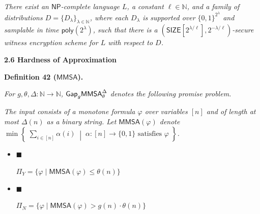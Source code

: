 \emph{There exist an ${\mathsf{NP}}$-complete language $L$, a constant $\ell\in\mathbb{N}$, and a family of distributions $D=\{D_{\lambda}\}_{\lambda\in\mathbb{N}}$, where each $D_{\lambda}$ is supported over $\{0,1\}^{2^{\lambda}}$ and samplable in time ${\mathsf{poly}}(2^{\lambda})$, such that there is a $({\mathsf{SIZE}}[2^{\lambda/\ell}],2^{-\lambda/\ell})$-secure witness encryption scheme for $L$ with respect to $D$.}\par







\par\medskip\noindent\textbf{
2.6 Hardness of Approximation}\par





\par\medskip\noindent\textbf{
\textbf{Definition 42}\textbf{ }(${\mathsf{MMSA}}$)\textbf{.}
}\par



\emph{For $g,\theta,\Delta:\mathbb{N}\to\mathbb{N}$, ${\sf Gap}_{g}{\mathsf{MMSA}}^{\Delta}_{\theta}$ denotes the following promise problem.}\par




\emph{The input consists of a monotone formula $\varphi$ over variables $[n]$ and of length at most $\Delta(n)$ as a binary string. Let ${\mathsf{MMSA}}(\varphi)$ denote $\min\left\{\;\sum_{i\in[n]}\alpha(i)\;\middle|\;\alpha:[n]\to\{0,1\}\text{ satisfies }\varphi\;\right\}$.}\par


\begin{itemize}


\item[] 
$\blacksquare$ 


$\Pi_{Y}=\{\varphi\mid{\mathsf{MMSA}}(\varphi)\leq\theta(n)\}$\emph{}\par





\item[] 
$\blacksquare$ 


$\Pi_{N}=\{\varphi\mid{\mathsf{MMSA}}(\varphi)>g(n)\cdot\theta(n)\}$\emph{}\par





\end{itemize}



